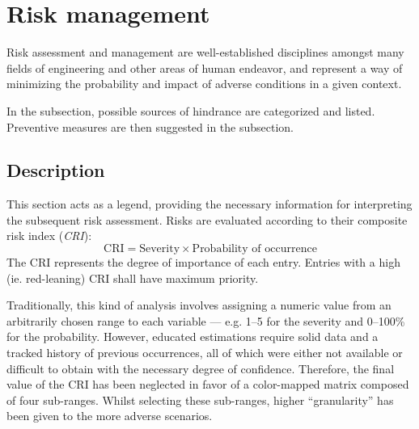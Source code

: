 \section{Risk management}

Risk assessment and management are well-established disciplines amongst many fields of engineering and other areas of human endeavor, and represent a way of minimizing the probability and impact of adverse conditions in a given context.

In the  subsection, possible sources of hindrance are categorized and listed.
Preventive measures are then suggested in the  subsection.


\subsection{Description}
This section acts as a legend, providing the necessary information for interpreting the subsequent risk assessment.
Risks are evaluated according to their composite risk index (\emph{CRI}):
\begin{equation}
    \text{CRI} = \text{Severity} \times \text{Probability of occurrence}
\end{equation}
The CRI represents the degree of importance of each entry.
Entries with a high (ie. red-leaning) CRI shall have maximum priority.

Traditionally, this kind of analysis involves assigning a numeric value from an arbitrarily chosen range to each variable --- e.g. 1--5 for the severity and 0--100\% for the probability.
However, educated estimations require solid data and a tracked history of previous occurrences, all of which were either not available or difficult to obtain with the necessary degree of confidence. \cite{risk}
Therefore, the final value of the CRI has been neglected in favor of a color-mapped matrix composed of four sub-ranges.
Whilst selecting these sub-ranges, higher ``granularity'' has been given to the more adverse scenarios.

